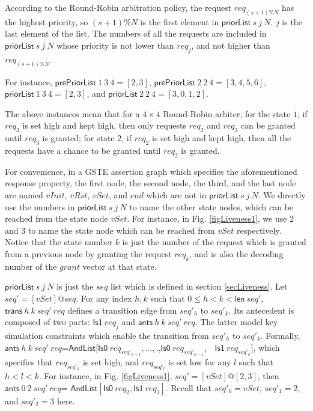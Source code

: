 \documentclass[final]{IEEEtran}
\begin{document}
According to the Round-Robin arbitration policy, the request
$req_{(s+1)\%N}$ has the highest priority, so $(s+1)\%N$ is the
first element in $\mathsf{priorList}\ s\ j\ N$. $j$ is the last
element of the list. %
The
numbers of all the requests are included in $\mathsf{priorList}\ s\
j\ N$ whose priority is not lower than $req_j$, and not higher than
$req_{(s+1)\%N}$.

For instance, $ \mathsf{prePriorList}\ 1\ 3\ 4 =[2,3]$,
    $ \mathsf{prePriorList}\ 2\ 2\ 4=[3,4,5,6]$,
$\mathsf{priorList}\ 1\ 3\ 4=[2,3]$, and $\mathsf{priorList}\ 2\ 2\
4=[3,0,1,2]$.

The above instances mean that for a $4\times4$ Round-Robin arbiter,
for the state $1$, if $req_3$ is set high and kept high, then only
requests $req_2$ and $req_3$ can be granted until $req_3$ is
granted; for state $2$, if $req_2$ is set high and kept high, then
all the requests have a chance to be granted until $req_2$  is
granted.

For convenience, in a GSTE assertion graph which specifies the
aforementioned response property, the first node, the second node,
the third, and the last node are named $vInit$, $vRst$,  $vSet$, and
$end$ which are not
  in $\mathsf{priorList}\ s\ j\ N$. We directly use the
numbers in $\mathsf{priorList}\ s\ j\ N$ to  name the other state
nodes, which can be reached from the state node $vSet$. For
instance,  in Fig. \ref{figLiveness1}, we use 2 and 3 to name the
state node which can be reached from $vSet$ respectively. Notice
that the state number $k$ is just the number of the request which is
granted from a previous node by granting the request $req_k$, and is also
the decoding number of the $grant$ vector at that state.

$\mathsf{priorList}\ s\ j\ N$ is just the $seq$ list which is
defined in section \ref{secLiveness}. Let\  $seq'=[vSet]@seq$. For
any index $h,k$ such that $0\le h <k<\mathsf{len}\ seq'$,
$\mathsf{trans}\ h \ k\ seq'\ req$ defines a transition edge  from
$seq'_h$ to $seq'_k$. Its antecedent is composed of two parts:
$\mathsf{Is1}\ req_j$ and $\mathsf{ants} \ h \ k\ seq'\ req$. The
latter model key simulation constraints
 which enable the transition from
$seq'_h$ to $seq'_k$. Formally, $\mathsf{ants} \ h \ k\ seq'\
req$=$\mathsf{AndList}[\mathsf{Is0}\ req_{seq'_{h+1}},...,.
$,$\mathsf{Is0}\ req_{seq'_{k-1}}$,\ \ $\mathsf{Is1}\
req_{seq'_{k}}]$, which specifies that $req_{seq'_{k}}$ is set high,
and
 $req_{seq'_{l}}$  is set low for any $l$ such that $h<l<k$.
  For instance, in Fig. \ref{figLiveness1}, $seq'=[vSet]@[2,3]$,
  then $\mathsf{ants} \ 0 \ 2\ seq'\ req$= $\mathsf{AndList}[
\mathsf{Is0}\ req_{2}, \mathsf{Is1}\ req_{3}]$. Recall that
$seq'_0=vSet$, $seq'_1=2$, and $seq'_2=3$ here.
\end{document}
